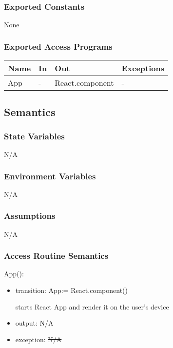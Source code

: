 \documentclass[12pt, titlepage]{article}
\newcommand{\rt}[1]{\textcolor{red}{#1}}
\begin{document}
\subsubsection{Exported Constants}
None

\subsubsection{Exported Access Programs}
\begin{table}[h!]
  \centering
  \begin{tabular}{llll}
    \hline
    \textbf{Name} & \textbf{In} & \textbf{Out}          & \textbf{Exceptions} \\
    \hline
    App     & -     & React.component & -             \\
    \hline
  \end{tabular}
\end{table}

\subsection{Semantics}

\subsubsection{State Variables}
N/A

\subsubsection{Environment Variables}
N/A

\subsubsection{Assumptions}
N/A

\subsubsection{Access Routine Semantics}

\noindent App():
\begin{itemize}
\item transition: App:= React.component()

  starts React App and render it on the user's device
\item output: N/A
\item exception: \sout{N/A} \rt{}
\end{itemize}
\end{document}
